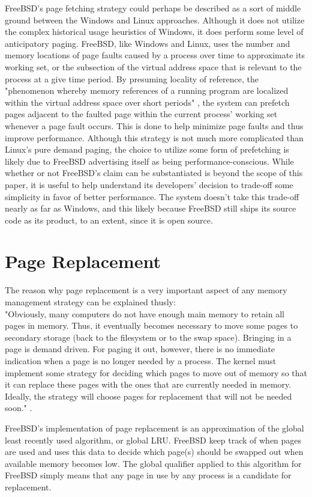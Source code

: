 \documentclass[onecolumn, draftclsnofoot,10pt, compsoc]{IEEEtran}
\begin{document}
FreeBSD's page fetching strategy could perhaps be described as a sort of middle ground between the Windows and Linux approaches. Although it does not utilize the complex historical usage heuristics of Windows, it does perform some level of anticipatory paging. FreeBSD, like Windows and Linux, uses the number and memory locations of page faults caused by a process over time to approximate its working set, or the subsection of the virtual address space that is relevant to the process at a give time period. By presuming locality of reference, the "phenomenon whereby memory references of a running program are localized within the virtual address space over short periods" \cite{FreeBSD}, the system can prefetch pages adjacent to the faulted page within the current process' working set whenever a page fault occurs. This is done to help minimize page faults and thus improve performance. Although this strategy is not much more complicated than Linux's pure demand paging, the choice to utilize some form of prefetching is likely due to FreeBSD advertising itself as being performance-conscious. While whether or not FreeBSD's claim can be substantiated is beyond the scope of this paper, it is useful to help understand its developers' decision to trade-off some simplicity in favor of better performance. The system doesn't take this trade-off nearly as far as Windows, and this likely because FreeBSD still ships its source code as its product, to an extent, since it is open source.

\section{Page Replacement}
The reason why page replacement is a very important aspect of any memory management strategy can be explained thusly:\\"Obviously, many computers do not have enough main memory to retain all pages in memory. Thus, it eventually becomes necessary to move some pages to secondary storage (back to the filesystem or to the swap space). Bringing in a page is demand driven. For paging it out, however, there is no immediate indication when a page is no longer needed by a process. The kernel must implement some strategy for deciding which pages to move out of memory so that it can replace these pages with the ones that are currently needed in memory. Ideally, the strategy will choose pages for replacement that will not be needed soon." \cite{FreeBSD}.
\par FreeBSD's implementation of page replacement is an approximation of the global least recently used algorithm, or global LRU. FreeBSD keep track of when pages are used and uses this data to decide which page(s) should be swapped out when available memory becomes low. The global qualifier applied to this algorithm for FreeBSD simply means that any page in use by any process is a candidate for replacement. 
\end{document}
